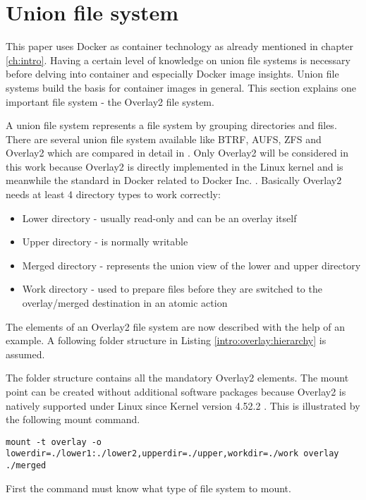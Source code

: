 \section{Union file system}
\label{sec:intro:docker_image:unionfs}
This paper uses Docker as container technology as already mentioned in chapter \ref{ch:intro}.
Having a certain level of knowledge on union file systems is necessary before delving into container and especially Docker image insights.
Union file systems build the basis for container images in general.
This section explains one important file system - the Overlay2 file system.

A union file system represents a file system by grouping directories and files.
There are several union file system available like BTRF, AUFS, ZFS and Overlay2 which are compared in detail in \cite{Tarasov2019}.
Only Overlay2 will be considered in this work because Overlay2 is directly implemented in the Linux kernel \cite{Tarasov2019} and is meanwhile the standard in Docker related to Docker Inc. \cite{docker_storage_driver}.
Basically Overlay2 needs at least 4 directory types to work correctly:
\begin{itemize}
\item Lower directory - usually read-only and can be an overlay itself
\item Upper directory - is normally writable
\item Merged directory - represents the union view of the lower and upper directory
\item Work directory - used to prepare files before they are switched to the overlay/merged destination in an atomic action 
\end{itemize}
The elements of an Overlay2 file system are now described with the help of an example. 
A following folder structure in Listing \ref{intro:overlay:hierarchy} is assumed.

The folder structure contains all the mandatory Overlay2 elements. 
The mount point can be created without additional software packages because Overlay2 is natively supported under Linux since Kernel version 4.52.2 \cite{}.
This is illustrated by the following mount command.
\begin{lstlisting}[label={intro:overlay:mountcmd}]
	mount -t overlay -o lowerdir=./lower1:./lower2,upperdir=./upper,workdir=./work overlay ./merged
\end{lstlisting}
First the command must know what type of file system to mount.
